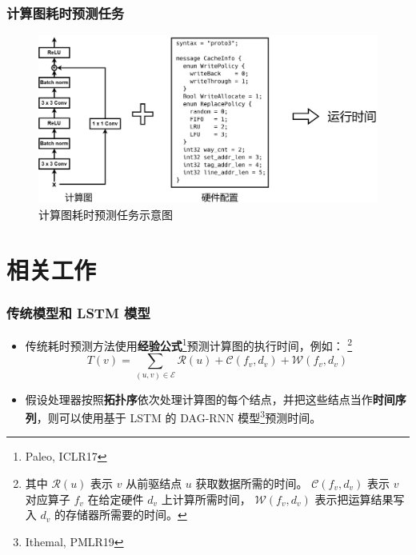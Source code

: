 \documentclass[notes=beamer]{ctexbeamer}
\begin{document}
\begin{frame}[c]
  \frametitle{计算图耗时预测任务}
  \begin{figure}
    \centering
    \includegraphics[width=1\textwidth]{figures/cg.png}
    \caption{计算图耗时预测任务示意图}
  \end{figure}
\end{frame}

\section{相关工作}

\begin{frame}
  \frametitle{传统模型和 LSTM 模型}
  \begin{itemize}
  \item 传统耗时预测方法使用\textbf{经验公式}\footnote[1]{Paleo, ICLR17}预测计算图的执行时间，例如：
  \footnote[2]{其中 $\mathcal{R}(u)$ 表示 $v$ 从前驱结点 $u$ 获取数据所需的时间。
  $\mathcal{C}(f_v,d_v)$ 表示 $v$ 对应算子 $f_v$ 在给定硬件 $d_v$ 上计算所需时间，
  $\mathcal{W}(f_v,d_v)$ 表示把运算结果写入 $d_v$ 的存储器所需要的时间。}
  $$
    T(v) = \sum \limits_{(u, v) \in \mathcal{E}}
    \mathcal{R} (u) + \mathcal{C}(f_v,d_v) + \mathcal{W}(f_v,d_v)
  $$
    \item 假设处理器按照\textbf{拓扑序}依次处理计算图的每个结点，并把这些结点当作\textbf{时间序列}，则可以使用基于 LSTM 的 DAG-RNN 模型\footnote[3]{Ithemal, PMLR19}预测时间。
  \end{itemize}
\end{frame}
\end{document}
